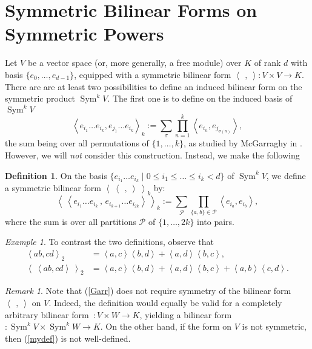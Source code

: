 \documentclass{amsart}
\DeclareMathOperator{\Sym}{Sym}
\newcommand{\coloneqq}{:=}
\newcommand{\bra}{\left<\!\!\!\:\left<}
\newcommand{\ket}{\right>\!\!\!\:\right>}
\theoremstyle{plain}
\theoremstyle{definition}
\newtheorem{definition}[theorem]{Definition}
\theoremstyle{remark}
\newtheorem{remark}[theorem]{Remark}
\newtheorem{example}[theorem]{Example}
\begin{document}
\section{Symmetric Bilinear Forms on Symmetric Powers}
Let $V$ be a vector space (or, more generally, a free module) over $K$ of rank $d$ with basis $\{e_0,\ldots,e_{d-1}\}$, equipped with a symmetric bilinear form $\left<\,\ ,\ \right>: V\times V \rightarrow K$. There are
are at least two possibilities to define an induced bilinear form on the symmetric product $\Sym^kV$. The first one is to define on the induced basis of $\Sym^kV$
\begin{equation}\label{Garr}
\left< e_{i_1}\ldots e_{i_k}, e_{j_1}\ldots e_{i_k}\right>_k \coloneqq \sum_\sigma  
\prod_{n=1}^k \left< e_{i_n},e_{j_{\sigma(n)}}\right>,
\end{equation}
the sum being over all permutations of $\{1,\ldots,k\}$, as studied by McGarraghy in \cite{McGarr}. However, we will \emph{not} consider 
this construction. Instead, we make the following
\begin{definition} On the basis $\{e_{i_1}\ldots e_{i_k}\;|\;0\leq i_1\leq\ldots\leq i_k<d\}$ of $\Sym^kV$, we define a symmetric bilinear form $\bra\ \,,\ \ket_k$ by: 
\begin{equation}
\label{mydef}
\bra e_{i_1}\ldots e_{i_k}\,,\,e_{i_{k+1}}\ldots e_{i_{2k}} \ket_k \coloneqq \sum_{\mathcal{P}} \prod_{\{a,b\}\in\mathcal{P}} \left<e_{i_a},e_{i_b}\right>,
\end{equation}
where the sum is over all partitions $\mathcal{P}$ of $\{1,\ldots,2k\}$ into pairs.
\end{definition}
\begin{example}
To contrast the two definitions, observe that 
\begin{align}
\left<ab,cd\right>_2 &= \left<a,c\right>\left<b,d\right>+\left<a,d\right>\left<b,c\right>, \\
\bra ab,cd\ket_2 &= \left<a,c\right>\left<b,d\right>+\left<a,d\right>\left<b,c\right> + \left<a,b\right>\left<c,d\right>.
\end{align}
\end{example}
\begin{remark}
Note that (\ref{Garr}) does not require symmetry of the bilinear form $\left<\,\ ,\ \right>$ on $V$. Indeed, the definition would equally be valid for a completely arbitrary bilinear form~$: V\times W \rightarrow K$, yielding a bilinear form $:\Sym^kV\times\Sym^kW\rightarrow K$. On the other hand, if the form on $V$ is not symmetric, then (\ref{mydef}) is not well-defined.
\end{remark}
\end{document}
